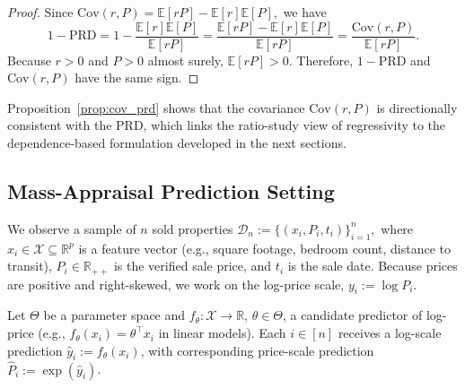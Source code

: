 \documentclass{article}
\theoremstyle{plain}
\theoremstyle{definition}
\newcommand{\R}{\mathbb{R}}
\newcommand{\1}{\mathbf{1}}
\newcommand{\Cov}{\text{Cov}}
\newcommand{\D}{\mathcal{D}}
\renewcommand{\R}{\mathbb{R}}
\newcommand{\Expected}[1]{\mathbb{E}[#1]}
\begin{document}
\begin{proof}
Since
$
\Cov(r,P)=\Expected{rP}-\Expected{r}\Expected{P},
$
we have
\[
1-\mathrm{PRD}
=
1-\frac{\Expected{r}\Expected{P}}{\Expected{rP}}
=
\frac{\Expected{rP}-\Expected{r}\Expected{P}}{\Expected{rP}}
=
\frac{\Cov(r,P)}{\Expected{rP}}.
\]
Because $r>0$ and $P>0$ almost surely, $\Expected{rP}>0$. Therefore, $1-\mathrm{PRD}$ and $\Cov(r,P)$ have the same sign.
\end{proof}

Proposition~\ref{prop:cov_prd} shows that the covariance $\Cov(r,P)$ is directionally consistent with the PRD, which links the ratio-study view of regressivity to the dependence-based formulation developed in the next sections.

\subsection{Mass-Appraisal Prediction Setting}
\label{subsec:prediction_setting}


We observe a sample of $n$ sold properties
$
\D_n := \{(x_i,P_i,t_i)\}_{i=1}^n,
$
where $x_i\in\mathcal X\subseteq\R^p$ is a feature vector (e.g., square footage, bedroom count, distance to transit), $P_i\in\R_{++}$ is the verified sale price, and $t_i$ is the sale date. Because prices are positive and right-skewed, we work on the log-price scale, $y_i := \log P_i$.

Let $\Theta$ be a parameter space and $f_\theta:\mathcal X\to\R$, $\theta\in\Theta$, a candidate predictor of log-price (e.g., $f_\theta(x_i)=\theta^\top x_i$ in linear models). Each $i\in[n]$ receives a log-scale prediction $\hat y_i := f_\theta(x_i)$, with corresponding price-scale prediction $\widehat P_i := \exp(\hat y_i)$.

\end{document}
